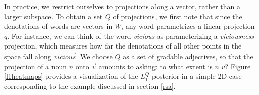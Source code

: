 \documentclass[9pt,twocolumn,twoside,lineno]{pnas-new}
\newcommand{\Listener}{L}
\newcommand{\QLONE}{\Listener_{{1}}^{{Q}}}
\begin{document}


		In practice, we restrict ourselves to projections along a vector, rather than a larger subspace. 
		To obtain a set $Q$ of projections, we first note that since the denotations of words are vectors in $W$, any word parametrizes a linear projection $q$. For instance, we can think of the word \emph{vicious} as parameterizing a \emph{viciousness} projection, which measures how far the denotations of all other points in the space fall along $\overrightarrow{\mathit{vicious}}$. 
		We choose $Q$ as a set of gradable adjectives, so that the projection of a noun $n$ onto $\overrightarrow{v}$ amounts to asking: to what extent is $n$ $v$? 
		Figure \ref{l1heatmaps} provides a visualization of the $\QLONE$ posterior in a simple 2D case corresponding to the example discussed in section \ref{rsa}.
\end{document}
